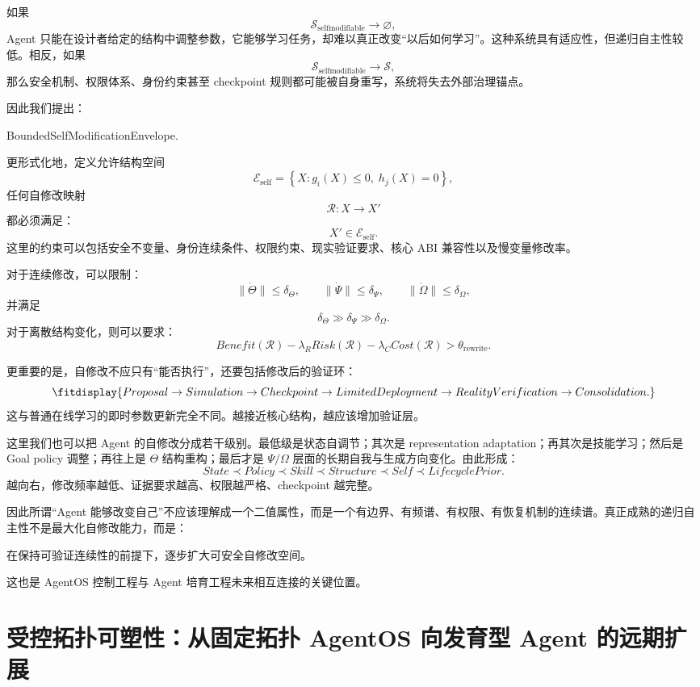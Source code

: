如果
\[
\mathcal S_{\mathrm{selfmodifiable}}
\rightarrow\varnothing,
\]
Agent 只能在设计者给定的结构中调整参数，它能够学习任务，却难以真正改变``以后如何学习''。这种系统具有适应性，但递归自主性较低。相反，如果
\[
\mathcal S_{\mathrm{selfmodifiable}}
\rightarrow\mathcal S,
\]
那么安全机制、权限体系、身份约束甚至 checkpoint 规则都可能被自身重写，系统将失去外部治理锚点。

因此我们提出：
\begin{statementbox}
BoundedSelfModificationEnvelope.
\end{statementbox}
更形式化地，定义允许结构空间
\[
\mathcal E_{\mathrm{self}}
=
\left\{
X:
g_i(X)\leq0,\;
h_j(X)=0
\right\},
\]
任何自修改映射
\[
\mathcal R:X\rightarrow X'
\]
都必须满足：
\[
X'\in\mathcal E_{\mathrm{self}}.
\]
这里的约束可以包括安全不变量、身份连续条件、权限约束、现实验证要求、核心 ABI 兼容性以及慢变量修改率。

对于连续修改，可以限制：
\[
\|\dot{\Theta}\|
\leq
\delta_\Theta,
\qquad
\|\dot{\Psi}\|
\leq
\delta_\Psi,
\qquad
\|\dot{\Omega}\|
\leq
\delta_\Omega,
\]
并满足
\[
\delta_\Theta
\gg
\delta_\Psi
\gg
\delta_\Omega.
\]
对于离散结构变化，则可以要求：
\[
Benefit(\mathcal R)
-
\lambda_R Risk(\mathcal R)
-
\lambda_C Cost(\mathcal R)
>
\theta_{\mathrm{rewrite}}.
\]

更重要的是，自修改不应只有``能否执行''，还要包括修改后的验证环：
\[
\fitdisplay{
Proposal
\rightarrow
Simulation
\rightarrow
Checkpoint
\rightarrow
LimitedDeployment
\rightarrow
RealityVerification
\rightarrow
Consolidation.
}
\]
这与普通在线学习的即时参数更新完全不同。越接近核心结构，越应该增加验证层。

这里我们也可以把 Agent 的自修改分成若干级别。最低级是状态自调节；其次是 representation adaptation；再其次是技能学习；然后是 Goal policy 调整；再往上是 $\Theta$ 结构重构；最后才是 $\Psi/\Omega$ 层面的长期自我与生成方向变化。由此形成：
\[
\boxed{
State
\prec
Policy
\prec
Skill
\prec
Structure
\prec
Self
\prec
LifecyclePrior.
}
\]
越向右，修改频率越低、证据要求越高、权限越严格、checkpoint 越完整。

因此所谓``Agent 能够改变自己''不应该理解成一个二值属性，而是一个有边界、有频谱、有权限、有恢复机制的连续谱。真正成熟的递归自主性不是最大化自修改能力，而是：
\begin{remark}
在保持可验证连续性的前提下，逐步扩大可安全自修改空间。
\end{remark}
这也是 AgentOS 控制工程与 Agent 培育工程未来相互连接的关键位置。

\section{受控拓扑可塑性：从固定拓扑 AgentOS 向发育型 Agent 的远期扩展}

